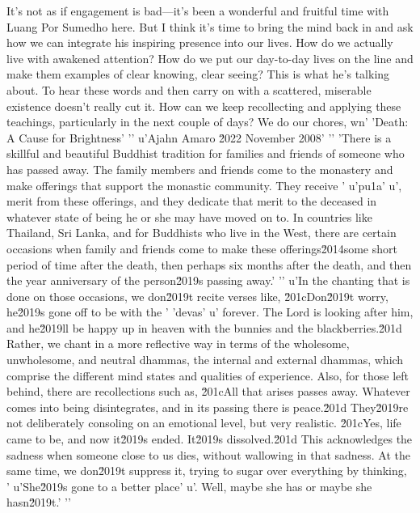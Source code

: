 It's not as if engagement is bad---it's been a wonderful and fruitful 
time with Luang Por Sumedho here. But I think it's time to bring the 
mind back in and ask how we can integrate his inspiring presence into 
our lives. How do we actually live with awakened attention? How do we 
put our day-to-day lives on the line and make them examples of clear 
knowing, clear seeing? This is what he's talking about. To hear these 
words and then carry on with a scattered, miserable existence doesn't 
really cut it. How can we keep recollecting and applying these 
teachings, particularly in the next couple of days? We do our chores, 
wn'
'Death: A Cause for Brightness'
'\n'
u'Ajahn Amaro \u2022 November 2008'
'\n'
'There is a skillful and beautiful Buddhist tradition for families and friends of someone who has passed away. The family members and friends come to the monastery and make offerings that support the monastic community. They receive '
u'pu\xf1a'
u', merit from these offerings, and they dedicate that merit to the deceased in whatever state of being he or she may have moved on to. In countries like Thailand, Sri Lanka, and for Buddhists who live in the West, there are certain occasions when family and friends come to make these offerings\u2014some short period of time after the death, then perhaps six months after the death, and then the year anniversary of the person\u2019s passing away.'
'\n'
u'In the chanting that is done on those occasions, we don\u2019t recite verses like, \u201cDon\u2019t worry, he\u2019s gone off to be with the '
'devas'
u' forever. The Lord is looking after him, and he\u2019ll be happy up in heaven with the bunnies and the blackberries.\u201d Rather, we chant in a more reflective way in terms of the wholesome, unwholesome, and neutral dhammas, the internal and external dhammas, which comprise the different mind states and qualities of experience. Also, for those left behind, there are recollections such as, \u201cAll that arises passes away. Whatever comes into being disintegrates, and in its passing there is peace.\u201d They\u2019re not deliberately consoling on an emotional level, but very realistic. \u201cYes, life came to be, and now it\u2019s ended. It\u2019s dissolved.\u201d This acknowledges the sadness when someone close to us dies, without wallowing in that sadness. At the same time, we don\u2019t suppress it, trying to sugar over everything by thinking, '
u'She\u2019s gone to a better place'
u'. Well, maybe she has or maybe she hasn\u2019t.'
'\n'
